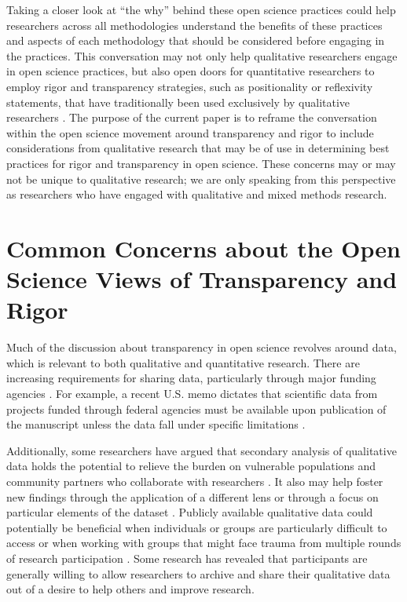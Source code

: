 \documentclass[authordate, meta, issue]{jote-new-article}
\begin{document}
Taking a closer look at “the why” behind these open science practices could help researchers across all methodologies understand the benefits of these practices and aspects of each methodology that should be considered before engaging in the practices. This conversation may not only help qualitative researchers engage in open science practices, but also open doors for quantitative researchers to employ rigor and transparency strategies, such as positionality or reflexivity statements, that have traditionally been used exclusively by qualitative researchers \parencites[e.g.,][]{Jamieson2022}. The purpose of the current paper is to reframe the conversation within the open science movement around transparency and rigor to include considerations from qualitative research that may be of use in determining best practices for rigor and transparency in open science. These concerns may or may not be unique to qualitative research; we are only speaking from this perspective as researchers who have engaged with qualitative and mixed methods research.







\section{Common Concerns about the Open Science Views of Transparency and Rigor}



Much of the discussion about transparency in open science revolves around data, which is relevant to both qualitative and quantitative research. There are increasing requirements for sharing data, particularly through major funding agencies \parencites[e.g.,][]{NIH2020}. For example, a recent U.S. memo dictates that scientific data from projects funded through federal agencies must be available upon publication of the manuscript unless the data fall under specific limitations \parencites{OfficeofScience2022}.



Additionally, some researchers have argued that secondary analysis of qualitative data holds the potential to relieve the burden on vulnerable populations and community partners who collaborate with researchers \parencites[e.g.,][]{Ruggiano2019}. It also may help foster new findings through the application of a different lens or through a focus on particular elements of the dataset \parencites{Long-Sutehall2011}. Publicly available qualitative data could potentially be beneficial when individuals or groups are particularly difficult to access \parencites{Fielding2004} or when working with groups that might face trauma from multiple rounds of research participation \parencites{Ruggiano2019}. Some research has revealed that participants are generally willing to allow researchers to archive and share their qualitative data \parencites[e.g.,][]{Cummings2015}{Mozersky2020}{VandeVusse2022} out of a desire to help others and improve research.
\end{document}
